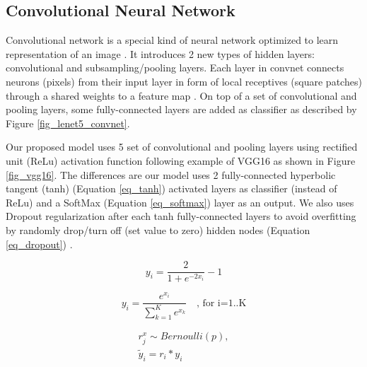 \documentclass[conference]{IEEEtran}
\begin{document}
\subsection{Convolutional Neural Network}

Convolutional network is a special kind of neural network optimized to learn representation of an image \cite{lecun2015deep}. It introduces 2 new types of hidden layers: convolutional and subsampling/pooling layers. Each layer in convnet connects neurons (pixels) from their input layer in form of local receptives (square patches) through a shared weights to a feature map \cite{lecun1998gradient}. On top of a set of convolutional and pooling layers, some fully-connected layers are added as classifier as described by Figure \ref{fig_lenet5_convnet}.

Our proposed model uses 5 set of convolutional and pooling layers using rectified unit (ReLu) activation function following example of VGG16 as shown in Figure \ref{fig_vgg16}. The differences are our model uses 2 fully-connected hyperbolic tangent (tanh) (Equation \ref{eq_tanh}) activated layers as classifier (instead of ReLu) and a SoftMax (Equation \ref{eq_softmax}) layer as an output. We also uses Dropout regularization after each tanh fully-connected layers to avoid overfitting by randomly drop/turn off (set value to zero) hidden nodes (Equation \ref{eq_dropout}) \cite{srivastava2014dropout}.

\begin{equation}
y_{i}={\frac {2}{1+e^{-2x _{i}}}}-1
\label{eq_tanh}
\end{equation}


\begin{equation}
y_{i}={\frac {e^{x _{i}}}{\sum _{k=1}^K e^{x _{k}}}} \quad \text{, for i=1..K}
\label{eq_softmax}
\end{equation}

\begin{align}
r_{j}^{x} \sim Bernoulli(p), \nonumber \\
\tilde{y} _{i}= r _{i} * y _{i}
\label{eq_dropout}
\end{align}
\end{document}

